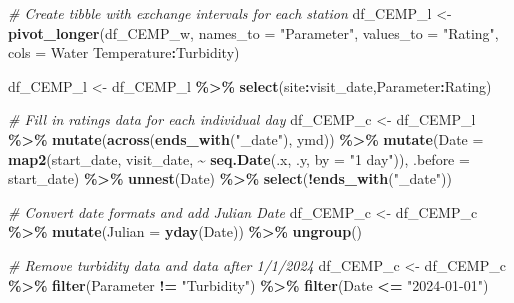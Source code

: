 \documentclass[
]{article}
\newenvironment{Shaded}{\begin{snugshade}}{\end{snugshade}}
\newcommand{\AttributeTok}[1]{\textcolor[rgb]{0.13,0.29,0.53}{#1}}
\newcommand{\CommentTok}[1]{\textcolor[rgb]{0.56,0.35,0.01}{\textit{#1}}}
\newcommand{\FunctionTok}[1]{\textcolor[rgb]{0.13,0.29,0.53}{\textbf{#1}}}
\newcommand{\NormalTok}[1]{#1}
\newcommand{\OtherTok}[1]{\textcolor[rgb]{0.56,0.35,0.01}{#1}}
\newcommand{\SpecialCharTok}[1]{\textcolor[rgb]{0.81,0.36,0.00}{\textbf{#1}}}
\newcommand{\StringTok}[1]{\textcolor[rgb]{0.31,0.60,0.02}{#1}}
\begin{document}
\begin{Shaded}
\begin{Highlighting}[]
\CommentTok{\# Create tibble with exchange intervals for each station}
\NormalTok{df\_CEMP\_l }\OtherTok{\textless{}{-}} \FunctionTok{pivot\_longer}\NormalTok{(df\_CEMP\_w, }
                          \AttributeTok{names\_to =} \StringTok{"Parameter"}\NormalTok{, }
                          \AttributeTok{values\_to =} \StringTok{"Rating"}\NormalTok{,}
                          \AttributeTok{cols =} \StringTok{\textasciigrave{}}\AttributeTok{Water Temperature}\StringTok{\textasciigrave{}}\SpecialCharTok{:}\NormalTok{Turbidity)}

\NormalTok{df\_CEMP\_l }\OtherTok{\textless{}{-}}\NormalTok{ df\_CEMP\_l }\SpecialCharTok{\%\textgreater{}\%} 
  \FunctionTok{select}\NormalTok{(site}\SpecialCharTok{:}\NormalTok{visit\_date,Parameter}\SpecialCharTok{:}\NormalTok{Rating)}

\CommentTok{\# Fill in ratings data for each individual day}
\NormalTok{df\_CEMP\_c }\OtherTok{\textless{}{-}}\NormalTok{ df\_CEMP\_l }\SpecialCharTok{\%\textgreater{}\%} 
  \FunctionTok{mutate}\NormalTok{(}\FunctionTok{across}\NormalTok{(}\FunctionTok{ends\_with}\NormalTok{(}\StringTok{"\_date"}\NormalTok{), ymd)) }\SpecialCharTok{\%\textgreater{}\%} 
  \FunctionTok{mutate}\NormalTok{(}\AttributeTok{Date =} \FunctionTok{map2}\NormalTok{(start\_date, }
\NormalTok{                     visit\_date, }\SpecialCharTok{\textasciitilde{}} \FunctionTok{seq.Date}\NormalTok{(.x, .y, }\AttributeTok{by =} \StringTok{"1 day"}\NormalTok{)), }
         \AttributeTok{.before =}\NormalTok{ start\_date) }\SpecialCharTok{\%\textgreater{}\%} 
  \FunctionTok{unnest}\NormalTok{(Date) }\SpecialCharTok{\%\textgreater{}\%} 
  \FunctionTok{select}\NormalTok{(}\SpecialCharTok{!}\FunctionTok{ends\_with}\NormalTok{(}\StringTok{"\_date"}\NormalTok{))}

\CommentTok{\# Convert date formats and add Julian Date}
\NormalTok{df\_CEMP\_c }\OtherTok{\textless{}{-}}\NormalTok{ df\_CEMP\_c }\SpecialCharTok{\%\textgreater{}\%} 
  \FunctionTok{mutate}\NormalTok{(}\AttributeTok{Julian =} \FunctionTok{yday}\NormalTok{(Date)) }\SpecialCharTok{\%\textgreater{}\%} 
  \FunctionTok{ungroup}\NormalTok{()}

\CommentTok{\# Remove turbidity data and data after 1/1/2024}
\NormalTok{df\_CEMP\_c }\OtherTok{\textless{}{-}}\NormalTok{ df\_CEMP\_c }\SpecialCharTok{\%\textgreater{}\%} 
  \FunctionTok{filter}\NormalTok{(Parameter }\SpecialCharTok{!=} \StringTok{"Turbidity"}\NormalTok{) }\SpecialCharTok{\%\textgreater{}\%} 
  \FunctionTok{filter}\NormalTok{(Date }\SpecialCharTok{\textless{}=} \StringTok{"2024{-}01{-}01"}\NormalTok{)}
\end{Highlighting}
\end{Shaded}
\end{document}
